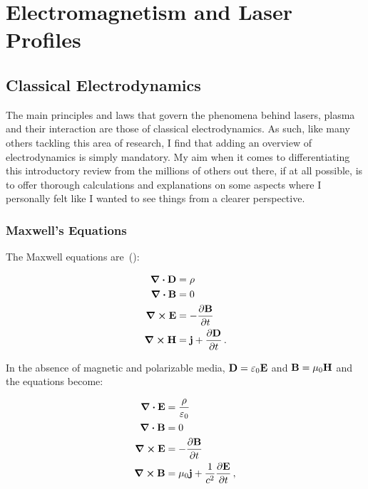 \documentclass[12pt, class=report, crop=false]{standalone}
\begin{document}
\chapter{Electromagnetism and Laser Profiles}%
\label{chap:electromagnetism}

\section{Classical Electrodynamics}

The main principles and laws that govern the phenomena behind lasers, plasma and their interaction are those of classical electrodynamics. As such, like many others tackling this area of research, I find that adding an overview of electrodynamics is simply mandatory. My aim when it comes to differentiating this introductory review from the millions of others out there, if at all possible, is to offer thorough calculations and explanations on some aspects where I personally felt like I wanted to see things from a clearer perspective.

\subsection{Maxwell's Equations}

The Maxwell equations are~(\cite{jacksonClassicalElectrodynamics1999}):

\begin{subequations}
  \label{eq:maxwell-general}
  \begin{align}
    \div{\vb{D}} & = \rho
    \label{eq:coulomb-law-general} \\
    \div{\vb{B}} & = 0
    \label{eq:gauss-law-general} \\
    \curl{\vb{E}} & = - \pdv{\vb{B}}{t}
    \label{eq:faraday-law-general} \\
    \curl{\vb{H}} & = \vb{j} + \pdv{\vb{D}}{t}
    \label{eq:ampere-law-general} \,.
  \end{align}
\end{subequations}

In the absence of magnetic and polarizable media, \(\vb{D}=\varepsilon_0 \vb{E}\) and \(\vb{B}=\mu_0 \vb{H}\) and the equations become:

\begin{subequations}
  \label{eq:maxwell}
  \begin{align}
    \div{\vb{E}} & = \frac{\rho}{\varepsilon_0} \label{eq:coulomb-law} \\
    \div{\vb{B}} & = 0 \label{eq:gauss-law} \\
    \curl{\vb{E}} & = - \pdv{\vb{B}}{t} \label{eq:faraday-law} \\
    \curl{\vb{B}} & = \mu_0 \vb{j} + \frac{1}{c^2} \pdv{\vb{E}}{t} \,, \label{eq:ampere-law}
  \end{align}
\end{subequations}
\end{document}
